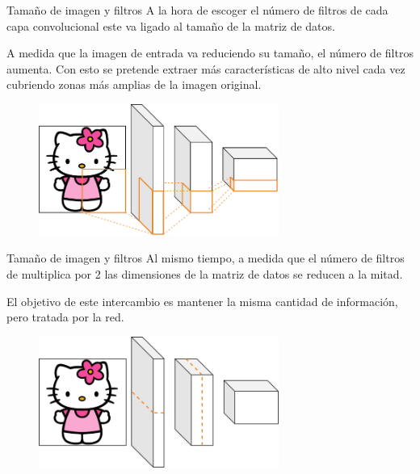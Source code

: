 \begin{frame}{Tamaño de imagen y filtros}
A la hora de escoger el \alert{número de filtros} de cada capa convolucional este va \alert{ligado} al tamaño de la \alert{matriz de datos}.

A medida que la imagen de entrada va \alert{reduciendo} su tamaño, el número de filtros \alert{aumenta}. Con esto se pretende extraer más \alert{características de alto nivel} cada vez cubriendo zonas más amplias de la imagen original.

\begin{figure}
    \centering
    \includegraphics[width=0.7\textwidth]{Slides/figures/Tema 3/DimensionFilters.png}
\end{figure}
\end{frame}

\begin{frame}{Tamaño de imagen y filtros}
Al mismo tiempo, a medida que el \alert{número} de filtros de \alert{multiplica por 2} las \alert{dimensiones} de la matriz de datos se \alert{reducen a la mitad}.

El objetivo de este \alert{intercambio} es mantener la \alert{misma cantidad} de información, pero tratada por la red.

\begin{figure}
    \centering
    \includegraphics[width=0.7\textwidth]{Slides/figures/Tema 3/ResolutionFilter_1.png}
\end{figure}
\end{frame}

